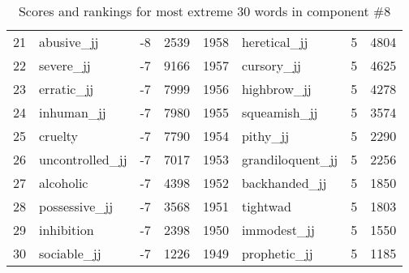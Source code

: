 \begin{table}[tbp]
\begin{tabular}{| rlr@{.}l | rlr@{.}l |}
    21 & abusive\_jj & -8 & 2539    &    1958 & heretical\_jj & 5 & 4804 \\
    22 & severe\_jj & -7 & 9166    &    1957 & cursory\_jj & 5 & 4625 \\
    23 & erratic\_jj & -7 & 7999    &    1956 & highbrow\_jj & 5 & 4278 \\
    24 & inhuman\_jj & -7 & 7980    &    1955 & squeamish\_jj & 5 & 3574 \\
    25 & cruelty & -7 & 7790    &    1954 & pithy\_jj & 5 & 2290 \\
    26 & uncontrolled\_jj & -7 & 7017    &    1953 & grandiloquent\_jj & 5 & 2256 \\
    27 & alcoholic & -7 & 4398    &    1952 & backhanded\_jj & 5 & 1850 \\
    28 & possessive\_jj & -7 & 3568    &    1951 & tightwad & 5 & 1803 \\
    29 & inhibition & -7 & 2398    &    1950 & immodest\_jj & 5 & 1550 \\
    30 & sociable\_jj & -7 & 1226    &    1949 & prophetic\_jj & 5 & 1185 \\
    \hline
    \end{tabular}
    \caption{Scores and rankings for most extreme 30 words in component \#8} 
\end{table}
\clearpage
